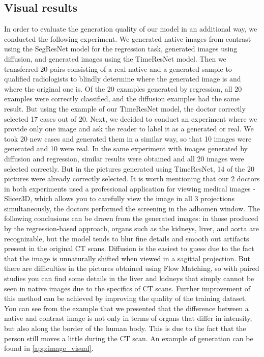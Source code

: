 \documentclass{article}
\begin{document}
\subsection{Visual results}
In order to evaluate the generation quality of our model in an additional way, we conducted the following experiment. We generated native images from contrast using the SegResNet model for the regression task, generated images using diffusion, and generated images using the TimeResNet model. Then we transferred 20 pairs consisting of a real native and a generated sample to qualified radiologists to blindly determine where the generated image is and where the original one is. Of the 20 examples generated by regression, all 20 examples were correctly classified, and the diffusion examples had the same result. But using the example of our TimeResNet model, the doctor correctly selected 17 cases out of 20. Next, we decided to conduct an experiment where we provide only one image and ask the reader to label it as  a generated or real. We took 20 new cases and generated them in a similar way, so that 10 images were generated and 10 were real. In the same experiment with images generated by diffusion and regression, similar results were obtained and all 20 images were selected correctly. But in the pictures generated using TimeResNet, 14 of the 20 pictures were already correctly selected. It is worth mentioning that our 2 doctors in both experiments used a professional application for viewing medical images - Slicer3D, which allows you to carefully view the image in all 3 projections simultaneously, the doctors performed the screening in the adbomen window. The following conclusions can be drawn from the generated images: in those produced by the regression-based approach, organs such as the kidneys, liver, and aorta are recognizable, but the model tends to blur fine details and smooth out artifacts present in the original CT scans. Diffusion is the easiest to guess due to the fact that the image is unnaturally shifted when viewed in a sagittal projection. But there are difficulties in the pictures obtained using Flow Matching, so with paired studies you can find some details in the liver and kidneys that simply cannot be seen in native images due to the specifics of CT scans. Further improvement of this method can be achieved by improving the quality of the training dataset. You can see from the example that we presented that the difference between a native and contrast image is not only in terms of organs that differ in intensity, but also along the border of the human body. This is due to the fact that the person still moves a little during the CT scan. An example of generation can be found in \ref{app:image_visual}.
\end{document}
